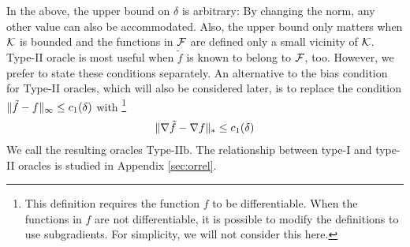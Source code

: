 In the above, the upper bound on $\delta$ is arbitrary: By changing the norm, any other value can also be accommodated. Also, the upper bound only matters when $\mathcal{K}$ is bounded and the functions in $\mathcal{F}$ are defined only a small vicinity of $\mathcal{K}$.
Type-II oracle is most useful when $\tilde{f}$ is known to belong to $\mathcal{F}$, too.
However, we prefer to state these conditions separately.
An alternative to the bias condition for Type-II oracles, which will also be considered later, is to replace the condition $\|\tilde{f}-f\|_\infty \le c_1(\delta)$ with%
\footnote{
This definition requires the function $f$ to be differentiable. When the functions in $f$ are not differentiable, it is possible
to modify the definitions to use subgradients. For simplicity, we will not consider this here.
}
\begin{align}
\label{eq:oracle2alt}
\|\nabla \tilde{f}- \nabla f\|_* \le c_1(\delta)
\end{align}
We call the resulting oracles Type-IIb. The relationship between type-I and type-II oracles is studied in Appendix \ref{sec:orrel}.

